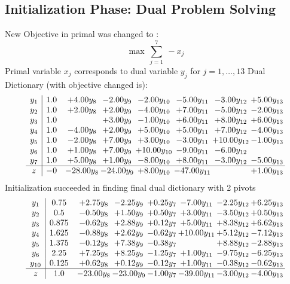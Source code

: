 \documentclass[9pt]{article}
\begin{document}
\subsection{Initialization Phase: Dual Problem Solving}
New Objective in primal was changed to : \[ \max\ \sum_{j=1}^{7}\ - x_j \] 
Primal variable $x_j$ corresponds to dual variable $y_j$ for $j = 1,\ldots,13$
Dual Dictionary (with objective changed is): 
\[\begin{array}{c| c c@{\hskip 2pt} c@{\hskip 2pt} c@{\hskip 2pt} c@{\hskip 2pt} c@{\hskip 2pt} c@{\hskip 2pt} }
 y_{1}   &  1.0 & +  4.00 y_{8} & -2.00 y_{9} & -2.00 y_{10} & -5.00 y_{11} & -3.00 y_{12} & +  5.00 y_{13}\\
 y_{2}   &  1.0 & +  2.00 y_{8} & +  2.00 y_{9} & -4.00 y_{10} & +  7.00 y_{11} & -5.00 y_{12} & -2.00 y_{13}\\
 y_{3}   &  1.0  &   & +  3.00 y_{9} & -1.00 y_{10} & +  6.00 y_{11} & +  8.00 y_{12} & +  6.00 y_{13}\\
 y_{4}   &  1.0 & -4.00 y_{8} & +  2.00 y_{9} & +  5.00 y_{10} & +  5.00 y_{11} & +  7.00 y_{12} & -4.00 y_{13}\\
 y_{5}   &  1.0 & -2.00 y_{8} & +  7.00 y_{9} & +  3.00 y_{10} & -3.00 y_{11} & + 10.00 y_{12} & -1.00 y_{13}\\
 y_{6}   &  1.0 & +  1.00 y_{8} & +  7.00 y_{9} & + 10.00 y_{10} & -9.00 y_{11} & -6.00 y_{12} &   \\
 y_{7}   &  1.0 & +  5.00 y_{8} & +  1.00 y_{9} & -8.00 y_{10} & +  8.00 y_{11} & -3.00 y_{12} & -5.00 y_{13}\\
\hline
z    &  -0 & -28.00 y_{8} & -24.00 y_{9} & +  8.00 y_{10} & -47.00 y_{11} &   & +  1.00 y_{13}\\
\end{array}\]
Initialization succeeded in finding final dual dictionary with 2 pivots
\[\begin{array}{c| c c@{\hskip 2pt} c@{\hskip 2pt} c@{\hskip 2pt} c@{\hskip 2pt} c@{\hskip 2pt} c@{\hskip 2pt} }
 y_{1}   &  0.75 & +  2.75 y_{8} & -2.25 y_{9} & +  0.25 y_{7} & -7.00 y_{11} & -2.25 y_{12} & +  6.25 y_{13}\\
 y_{2}   &  0.5 & -0.50 y_{8} & +  1.50 y_{9} & +  0.50 y_{7} & +  3.00 y_{11} & -3.50 y_{12} & +  0.50 y_{13}\\
 y_{3}   &  0.875 & -0.62 y_{8} & +  2.88 y_{9} & +  0.12 y_{7} & +  5.00 y_{11} & +  8.38 y_{12} & +  6.62 y_{13}\\
 y_{4}   &  1.625 & -0.88 y_{8} & +  2.62 y_{9} & -0.62 y_{7} & + 10.00 y_{11} & +  5.12 y_{12} & -7.12 y_{13}\\
 y_{5}   &  1.375 & -0.12 y_{8} & +  7.38 y_{9} & -0.38 y_{7} &   & +  8.88 y_{12} & -2.88 y_{13}\\
 y_{6}   &  2.25 & +  7.25 y_{8} & +  8.25 y_{9} & -1.25 y_{7} & +  1.00 y_{11} & -9.75 y_{12} & -6.25 y_{13}\\
 y_{10}   &  0.125 & +  0.62 y_{8} & +  0.12 y_{9} & -0.12 y_{7} & +  1.00 y_{11} & -0.38 y_{12} & -0.62 y_{13}\\
\hline
z    &  1.0 & -23.00 y_{8} & -23.00 y_{9} & -1.00 y_{7} & -39.00 y_{11} & -3.00 y_{12} & -4.00 y_{13}\\
\end{array}\]
\end{document}
